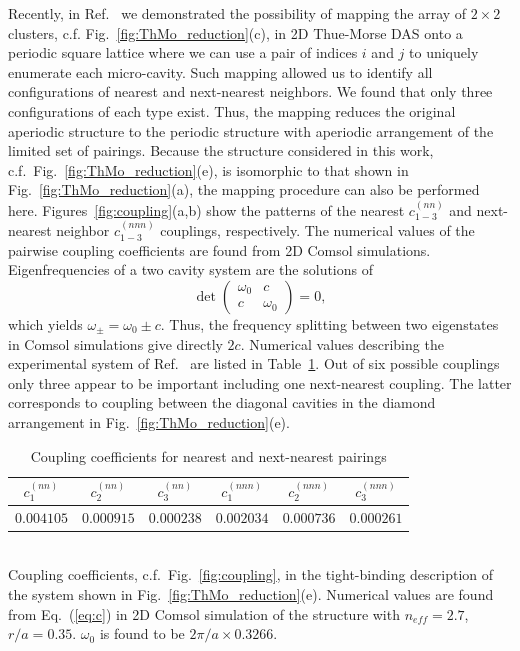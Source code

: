 Recently, in Ref.~ we demonstrated the possibility of mapping the array of $2\times2$ clusters, c.f. Fig.~\ref{fig:ThMo_reduction}(c), in 2D Thue-Morse DAS onto a periodic square lattice where we can use a pair of indices $i$ and $j$ to uniquely enumerate each micro-cavity.  Such mapping allowed us to  identify all configurations of nearest and next-nearest neighbors. We found that only three configurations of each type exist. Thus, the mapping reduces the original aperiodic structure to the periodic structure with aperiodic arrangement of the limited set of pairings. Because the structure considered in this work, c.f.~Fig.~\ref{fig:ThMo_reduction}(e), is isomorphic to that shown in Fig.~\ref{fig:ThMo_reduction}(a), the mapping procedure can also be performed here. Figures~\ref{fig:coupling}(a,b) show the patterns of the nearest $c^{(nn)}_{1-3}$ and next-nearest neighbor $c^{(nnn)}_{1-3}$  couplings, respectively. The numerical values of the pairwise coupling coefficients are found from 2D Comsol simulations. Eigenfrequencies of a two cavity system are the solutions of
\begin{equation}
\det\left(\begin{array}{cc}\omega_0&c\\ c&\omega_0\end{array}\right)=0,
\label{eq:c}
\end{equation}
which yields $\omega_\pm=\omega_0\pm c$. Thus, the frequency splitting between two eigenstates in Comsol simulations give directly $2c$. Numerical values describing the experimental system of Ref.~ are listed in Table~\ref{tab:c}. Out of six possible couplings only three appear to be important including one next-nearest coupling. The latter corresponds to coupling between the diagonal cavities in the diamond arrangement in Fig.~\ref{fig:ThMo_reduction}(e).

\begin{table}
\begin{center}
\caption{\label{tab:c}Coupling coefficients for nearest and next-nearest pairings}
\begin{tabular}{||c|c|c||c|c|c||}
\hline
$c^{(nn)}_{1}$ & $c^{(nn)}_{2}$ & $c^{(nn)}_{3}$ & $c^{(nnn)}_{1}$ & $c^{(nnn)}_{2}$ & $c^{(nnn)}_{3}$ \\ \hline
$0.004105$ & $0.000915$ & $0.000238$ & $0.002034$ & $0.000736$ & $0.000261$ \\
\hline
\end{tabular}
\end{center}

\ \\
Coupling coefficients, c.f.~Fig.~\ref{fig:coupling}, in the tight-binding description of the system shown in Fig.~\ref{fig:ThMo_reduction}(e). Numerical values are found from Eq.~(\ref{eq:c}) in 2D Comsol simulation of the structure with $n_{eff}=2.7$, $r/a=0.35$. $\omega_0$ is found to be $2\pi/a\times0.3266$.
\end{table}

